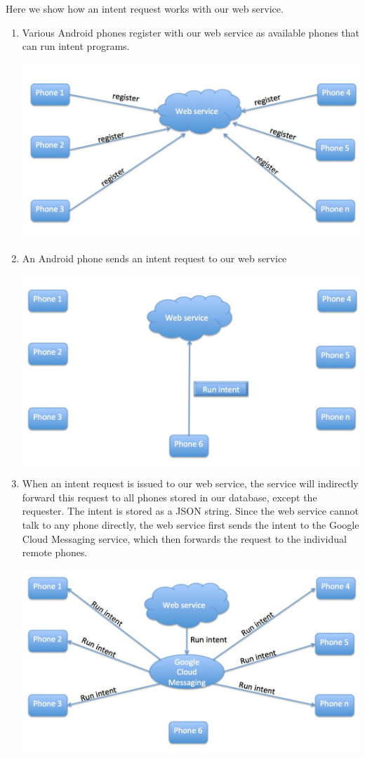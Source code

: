 \documentclass{acm_proc_article-sp}
\begin{document}
Here we show how an intent request works with our web service.

\begin{enumerate}
\item Various Android phones register with our web service as available phones that can run intent programs.  

\includegraphics[scale=0.45]{s1.jpg}

\item An Android phone sends an intent request to our web service

\includegraphics[scale=0.45]{s2.jpg}

\item  When an intent request is issued to our web service, the service will indirectly forward this request to all phones stored in our database, except the requester.  The intent is stored as a JSON string. Since the web service cannot talk to any phone directly, the web service first sends the intent to the Google Cloud Messaging service, which then forwards the request to the individual remote phones. 

\includegraphics[scale=0.45]{s3.jpg}


\end{enumerate}
\end{document}
